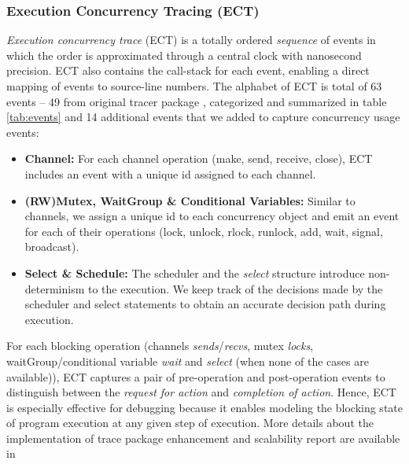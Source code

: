 \subsubsection{Execution Concurrency Tracing (ECT)}
\textit{Execution concurrency trace} (ECT) is a totally ordered \textit{sequence} of events in which the order is approximated through a central clock with nanosecond precision.
%
ECT also contains the call-stack for each event, enabling a direct mapping of events to source-line numbers.
%
The alphabet of ECT is total of 63 events -- 49 from original tracer package \cite{goParserSource}, categorized and summarized in table \ref{tab:events} and 14 additional events that we added to capture concurrency usage events:
%
\begin{itemize}
    \item \textbf{Channel:} For each channel operation (make, send, receive, close), ECT includes an event with a unique id assigned to each channel.
    \item \textbf{(RW)Mutex, WaitGroup \& Conditional Variables:} Similar to channels, we assign a unique id to each concurrency object and emit an event for each of their operations (lock, unlock, rlock, runlock, add, wait, signal, broadcast).
    \item \textbf{Select \& Schedule:} The scheduler and the \textit{select} structure introduce non-determinism to the execution. We keep track of the decisions made by the scheduler and select statements to obtain an accurate decision path during execution.
\end{itemize}



%
For each blocking operation (channels \textit{sends}/\textit{recvs}, mutex \textit{locks}, waitGroup/conditional variable \textit{wait} and \textit{select} (when none of the cases are available)), ECT captures a pair of pre-operation and post-operation events to distinguish between the \textit{request for action} and \textit{completion of action}.
%
Hence, ECT is especially effective for debugging because it enables modeling the blocking state of program execution at any given step of execution.
%
More details about the implementation of trace package enhancement and scalability report are available in \cite{ect-arxiv}

